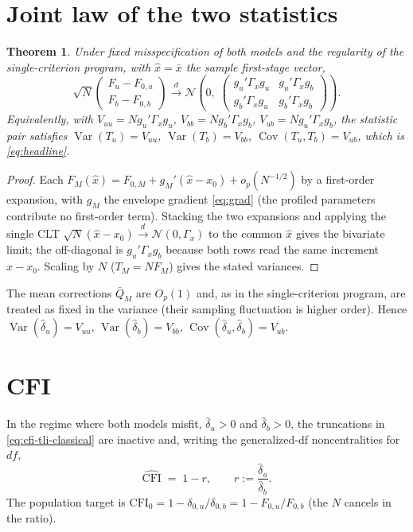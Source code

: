 \documentclass[11pt]{article}
\newcommand{\Var}{\operatorname{Var}}
\newcommand{\Cov}{\operatorname{Cov}}
\newcommand{\cfi}{\widehat{\mathrm{CFI}}}
\newcommand{\dto}{\xrightarrow{d}}
\theoremstyle{plain}
\newtheorem{theorem}{Theorem}
\theoremstyle{remark}
\begin{document}
\section{Joint law of the two statistics}\label{sec:joint}

\begin{theorem}\label{thm:joint}
Under fixed misspecification of both models and the regularity of the
single-criterion program, with $\hat x=\bar x$ the sample first-stage vector,
\[
  \sqrt N\begin{pmatrix}F_u-F_{0,u}\\[2pt]F_b-F_{0,b}\end{pmatrix}
  \dto
  \mathcal N\!\left(0,\;
  \begin{pmatrix}
    g_u'\Gamma_x g_u & g_u'\Gamma_x g_b\\[2pt]
    g_b'\Gamma_x g_u & g_b'\Gamma_x g_b
  \end{pmatrix}\right).
\]
Equivalently, with $V_{uu}=N g_u'\Gamma_x g_u$, $V_{bb}=N g_b'\Gamma_x g_b$,
$V_{ub}=N g_u'\Gamma_x g_b$, the statistic pair satisfies
$\Var(T_u)=V_{uu}$, $\Var(T_b)=V_{bb}$, $\Cov(T_u,T_b)=V_{ub}$, which is
\eqref{eq:headline}.
\end{theorem}

\begin{proof}
Each $F_M(\hat x)=F_{0,M}+g_M'(\hat x-x_0)+o_p(N^{-1/2})$ by a first-order
expansion, with $g_M$ the envelope gradient \eqref{eq:grad} (the profiled
parameters contribute no first-order term). Stacking the two expansions and
applying the single CLT $\sqrt N(\hat x-x_0)\dto\mathcal N(0,\Gamma_x)$ to the
common $\hat x$ gives the bivariate limit; the off-diagonal is
$g_u'\Gamma_x g_b$ because both rows read the same increment $\hat x-x_0$.
Scaling by $N$ ($T_M=NF_M$) gives the stated variances.
\end{proof}

The mean corrections $\bar Q_M$ are $O_p(1)$ and, as in the single-criterion
program, are treated as fixed in the variance (their sampling fluctuation is
higher order). Hence $\Var(\hat\delta_u)=V_{uu}$, $\Var(\hat\delta_b)=V_{bb}$,
$\Cov(\hat\delta_u,\hat\delta_b)=V_{ub}$.

\section{CFI}\label{sec:cfi}

In the regime where both models misfit, $\hat\delta_u>0$ and $\hat\delta_b>0$,
the truncations in \eqref{eq:cfi-tli-classical} are inactive and, writing the
generalized-df noncentralities for $df$,
\begin{equation}\label{eq:cfi}
  \cfi \;=\; 1-r,\qquad r:=\frac{\hat\delta_u}{\hat\delta_b}.
\end{equation}
The population target is $\mathrm{CFI}_0=1-\delta_{0,u}/\delta_{0,b}
=1-F_{0,u}/F_{0,b}$ (the $N$ cancels in the ratio).
\end{document}
